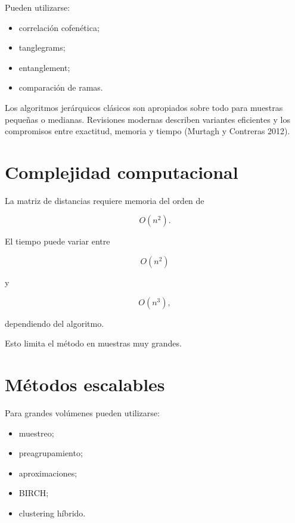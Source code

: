 \documentclass[
  spanish,
  10.5pt,
  letterpaper,
  DIV=11,
  numbers=noendperiod,
  oneside,
  open=any]{scrreprt}
\providecommand{\tightlist}{%
  \setlength{\itemsep}{0pt}\setlength{\parskip}{0pt}}
\theoremstyle{definition}
\theoremstyle{definition}
\theoremstyle{plain}
\theoremstyle{remark}
\begin{document}

Pueden utilizarse:

\begin{itemize}
\tightlist
\item
  correlación cofenética;
\item
  tanglegrams;
\item
  entanglement;
\item
  comparación de ramas.
\end{itemize}

Los algoritmos jerárquicos clásicos son apropiados sobre todo para
muestras pequeñas o medianas. Revisiones modernas describen variantes
eficientes y los compromisos entre exactitud, memoria y tiempo (Murtagh
y Contreras 2012).

\section*{Complejidad computacional}\label{complejidad-computacional-6}


La matriz de distancias requiere memoria del orden de

\[
O(n^2).
\]

El tiempo puede variar entre

\[
O(n^2)
\]

y

\[
O(n^3),
\]

dependiendo del algoritmo.

Esto limita el método en muestras muy grandes.

\section*{Métodos escalables}\label{muxe9todos-escalables}


Para grandes volúmenes pueden utilizarse:

\begin{itemize}
\tightlist
\item
  muestreo;
\item
  preagrupamiento;
\item
  aproximaciones;
\item
  BIRCH;
\item
  clustering híbrido.
\end{itemize}
\end{document}
